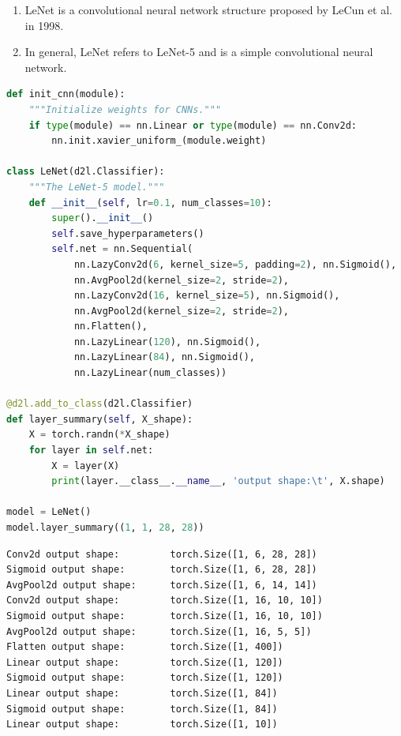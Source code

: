 \begin{enumerate}
    \item LeNet is a convolutional neural network structure proposed by LeCun et al. in 1998. \cite{ieee/726791/cnn-lenet}
    
    
    \item In general, LeNet refers to LeNet-5 and is a simple convolutional neural network.
\end{enumerate}

\begin{lstlisting}[language=Python]
def init_cnn(module):
    """Initialize weights for CNNs."""
    if type(module) == nn.Linear or type(module) == nn.Conv2d:
        nn.init.xavier_uniform_(module.weight)

class LeNet(d2l.Classifier):
    """The LeNet-5 model."""
    def __init__(self, lr=0.1, num_classes=10):
        super().__init__()
        self.save_hyperparameters()
        self.net = nn.Sequential(
            nn.LazyConv2d(6, kernel_size=5, padding=2), nn.Sigmoid(),
            nn.AvgPool2d(kernel_size=2, stride=2),
            nn.LazyConv2d(16, kernel_size=5), nn.Sigmoid(),
            nn.AvgPool2d(kernel_size=2, stride=2),
            nn.Flatten(),
            nn.LazyLinear(120), nn.Sigmoid(),
            nn.LazyLinear(84), nn.Sigmoid(),
            nn.LazyLinear(num_classes))

@d2l.add_to_class(d2l.Classifier)
def layer_summary(self, X_shape):
    X = torch.randn(*X_shape)
    for layer in self.net:
        X = layer(X)
        print(layer.__class__.__name__, 'output shape:\t', X.shape)

model = LeNet()
model.layer_summary((1, 1, 28, 28))
\end{lstlisting}


\begin{lstlisting}[numbers=none]
Conv2d output shape:         torch.Size([1, 6, 28, 28])
Sigmoid output shape:        torch.Size([1, 6, 28, 28])
AvgPool2d output shape:      torch.Size([1, 6, 14, 14])
Conv2d output shape:         torch.Size([1, 16, 10, 10])
Sigmoid output shape:        torch.Size([1, 16, 10, 10])
AvgPool2d output shape:      torch.Size([1, 16, 5, 5])
Flatten output shape:        torch.Size([1, 400])
Linear output shape:         torch.Size([1, 120])
Sigmoid output shape:        torch.Size([1, 120])
Linear output shape:         torch.Size([1, 84])
Sigmoid output shape:        torch.Size([1, 84])
Linear output shape:         torch.Size([1, 10])
\end{lstlisting}







